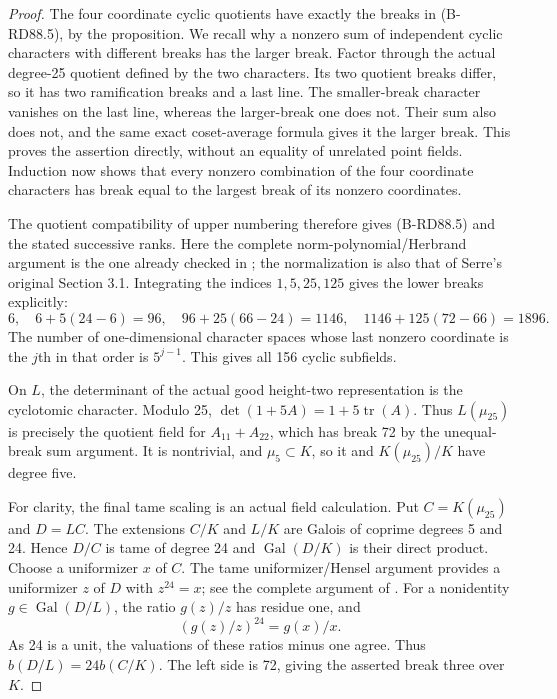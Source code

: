 \begin{proof}
The four coordinate cyclic quotients have exactly
the breaks in (B-RD88.5), by the proposition.
We recall why a nonzero sum of independent cyclic
characters with different breaks has the larger break.
Factor through the actual degree-25 quotient defined
by the two characters. Its two quotient breaks differ,
so it has two ramification breaks and a last line.
The smaller-break character vanishes on the last line,
whereas the larger-break one does not. Their sum also
does not, and the same exact coset-average formula
gives it the larger break. This proves the assertion
directly, without an equality of unrelated point fields.
Induction now shows that every nonzero combination of
the four coordinate characters has break equal to the
largest break of its nonzero coordinates.

The quotient compatibility of upper numbering therefore
gives (B-RD88.5) and the stated successive ranks. Here
the complete norm-polynomial/Herbrand argument is the
one already checked in
\cite[Proposition 3.7 and Theorem 3.10, full proofs,
pp.~14--16]{ColmezCorpsLocaux}; the normalization is
also that of Serre's original Section 3.1.
Integrating the indices \(1,5,25,125\) gives the lower
breaks explicitly:
\[
 6,\quad6+5(24-6)=96,\quad
 96+25(66-24)=1146,\quad
 1146+125(72-66)=1896.                                 \tag{B-RD88.7}
\]
The number of one-dimensional character spaces whose
last nonzero coordinate is the \(j\)th in that order
is \(5^{j-1}\). This gives all 156 cyclic subfields.

On \(L\), the determinant of the actual good height-two
representation is the cyclotomic character. Modulo 25,
\(\det(1+5A)=1+5\operatorname{tr}(A)\).
Thus \(L(\mu_{25})\) is precisely the quotient field
for \(A_{11}+A_{22}\), which has break 72 by the
unequal-break sum argument. It is nontrivial, and
\(\mu_5\subset K\), so it and \(K(\mu_{25})/K\)
have degree five.

For clarity, the final tame scaling is an actual
field calculation. Put \(C=K(\mu_{25})\) and
\(D=LC\). The extensions \(C/K\) and \(L/K\)
are Galois of coprime degrees 5 and 24. Hence
\(D/C\) is tame of degree 24 and
\(\operatorname{Gal}(D/K)\) is their direct product.
Choose a uniformizer \(x\) of \(C\). The tame
uniformizer/Hensel argument provides a uniformizer
\(z\) of \(D\) with \(z^{24}=x\); see the complete
argument of \cite[Proposition 2.12, p.~11]{ColmezCorpsLocaux}.
For a nonidentity \(g\in\operatorname{Gal}(D/L)\),
the ratio \(g(z)/z\) has residue one, and
\[
   (g(z)/z)^{24}=g(x)/x.
\]
As 24 is a unit, the valuations of these ratios minus
one agree. Thus
\(b(D/L)=24b(C/K)\). The left side is 72, giving
the asserted break three over \(K\).
\end{proof}

